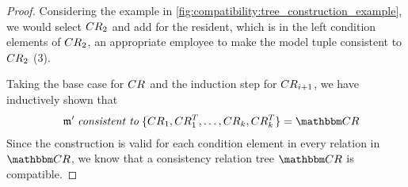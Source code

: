 \begin{proof}
    Considering the example in \autoref{fig:compatibility:tree_construction_example}, we would select $\consistencyrelation{CR}{2}$ and add for the resident, which is in the left condition elements of $\consistencyrelation{CR}{2}$, an appropriate employee to make the model tuple consistent to $\consistencyrelation{CR}{2}$ (3).
    
    Taking the base case for $\consistencyrelation{CR}{}$ and the induction step for $\consistencyrelation{CR}{i+1}$, we have inductively shown that 
    \begin{align*}
        \formulaskip 
        \modeltuple{m'} \consistenttomath \setted{\consistencyrelation{CR}{1}, \consistencyrelation{CR}{1}^T, \dots, \consistencyrelation{CR}{k}, \consistencyrelation{CR}{k}^T} = \consistencyrelationset{CR}
    \end{align*}
    Since the construction is valid for each condition element in every relation in $\consistencyrelationset{CR}$, we know that a consistency relation tree $\consistencyrelationset{CR}$ is compatible.
\end{proof}
